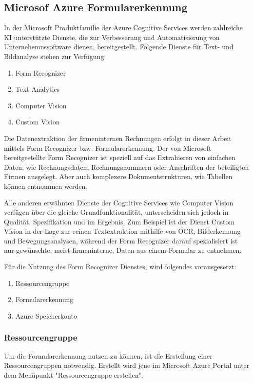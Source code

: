 \subsection{Microsof Azure Formularerkennung}

In der Microsoft Produktfamilie der Azure Cognitive Services werden zahlreiche KI unterstützte Dienste, die zur Verbesserung 
und Automatisierung von Unternehemnssoftware dienen, bereitgestellt. Folgende Dienste für Text- und Bildanalyse stehen zur Verfügung:

\begin{enumerate}
    \item Form Recognizer
    \item Text Analytics
    \item Computer Vision
    \item Custom Vision
\end{enumerate}

Die Datenextraktion der firmeninternen Rechnungen erfolgt in dieser Arbeit mittels Form Recognizer bzw. Formularerkennung.
Der von Microsoft bereitgestellte Form Recognizer ist speziell auf das Extrahieren von einfachen Daten, wie Rechnungsdaten, 
Rechnungsnummern oder Anschriften der beteiligten Firmen ausgelegt. Aber auch komplexere Dokumentstrukturen, wie Tabellen können entnommen 
werden. 

Alle anderen erwähnten Dienste der Cognitive Services wie Computer Vision verfügen über die gleiche Grundfunktionalität, unterscheiden 
sich jedoch in Qualität, Spezifikation und im Ergebnis. Zum Beispiel ist der Dienst Custom Vision in der Lage zur reinen Textextraktion mithilfe von OCR,
Bilderkennung und Bewegungsanalysen, während der Form Recognizer darauf spezialisiert ist nur gewünschte, meist firmeninterne, Daten aus einem Formular zu entnehmen.

Für die Nutzung des Form Recognizer Dienstes, wird folgendes vorausgesetzt:
\begin{enumerate}
    \item Ressourcengruppe
    \item Formularerkennung
    \item Azure Speicherkonto
\end{enumerate}

\subsubsection{Ressourcengruppe}
Um die Formularerkennung nutzen zu können, ist die Erstellung einer Ressourcengruppen notwendig. Erstellt wird jene im Microsoft Azure Portal unter dem Menüpunkt "Ressourcengruppe erstellen".

